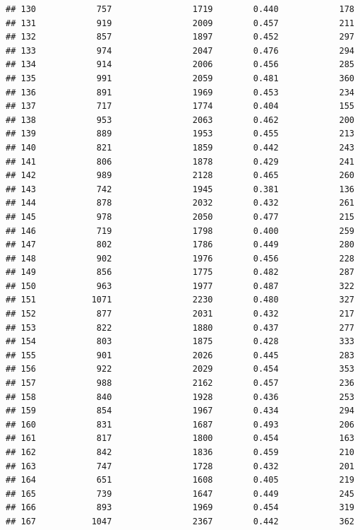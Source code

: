 \documentclass[]{book}
\begin{document}
\begin{verbatim}
## 130            757                1719        0.440            178
## 131            919                2009        0.457            211
## 132            857                1897        0.452            297
## 133            974                2047        0.476            294
## 134            914                2006        0.456            285
## 135            991                2059        0.481            360
## 136            891                1969        0.453            234
## 137            717                1774        0.404            155
## 138            953                2063        0.462            200
## 139            889                1953        0.455            213
## 140            821                1859        0.442            243
## 141            806                1878        0.429            241
## 142            989                2128        0.465            260
## 143            742                1945        0.381            136
## 144            878                2032        0.432            261
## 145            978                2050        0.477            215
## 146            719                1798        0.400            259
## 147            802                1786        0.449            280
## 148            902                1976        0.456            228
## 149            856                1775        0.482            287
## 150            963                1977        0.487            322
## 151           1071                2230        0.480            327
## 152            877                2031        0.432            217
## 153            822                1880        0.437            277
## 154            803                1875        0.428            333
## 155            901                2026        0.445            283
## 156            922                2029        0.454            353
## 157            988                2162        0.457            236
## 158            840                1928        0.436            253
## 159            854                1967        0.434            294
## 160            831                1687        0.493            206
## 161            817                1800        0.454            163
## 162            842                1836        0.459            210
## 163            747                1728        0.432            201
## 164            651                1608        0.405            219
## 165            739                1647        0.449            245
## 166            893                1969        0.454            319
## 167           1047                2367        0.442            362

\end{verbatim}
\end{document}
